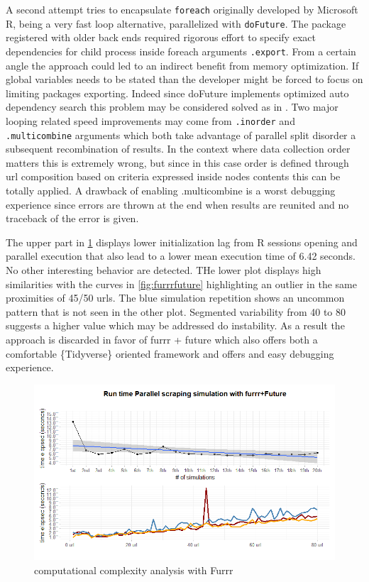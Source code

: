\documentclass[
  12pt,
  a4paper,
  oneside]{book}
\theoremstyle{definition}
\theoremstyle{definition}
\theoremstyle{definition}
\theoremstyle{remark}
\begin{document}
A second attempt tries to encapsulate \texttt{foreach} \citep{foreach} originally developed by Microsoft R, being a very fast loop alternative, parallelized with \texttt{doFuture}. The package registered with older back ends required rigorous effort to specify exact dependencies for child process inside foreach arguments \texttt{.export}. From a certain angle the approach could led to an indirect benefit from memory optimization. If global variables needs to be stated than the developer might be forced to focus on limiting packages exporting. Indeed since doFuture implements optimized auto dependency search this problem may be considered solved as in \citet{doFuture}. Two major looping related speed improvements may come from \texttt{.inorder} and \texttt{.multicombine} arguments which both take advantage of parallel split disorder a subsequent recombination of results. In the context where data collection order matters this is extremely wrong, but since in this case order is defined through url composition based on criteria expressed inside nodes contents this can be totally applied. A drawback of enabling .multicombine is a worst debugging experience since errors are thrown at the end when results are reunited and no traceback of the error is given.

The upper part in \ref{fig:foreachdofuture} displays lower initialization lag from R sessions opening and parallel execution that also lead to a lower mean execution time of 6.42 seconds. No other interesting behavior are detected.
THe lower plot displays high similarities with the curves in \ref{fig:furrrfuture} highlighting an outlier in the same proximities of 45/50 urls. The blue simulation repetition shows an uncommon pattern that is not seen in the other plot. Segmented variability from 40 to 80 suggests a higher value which may be addressed do instability. As a result the approach is discarded in favor of furrr + future which also offers both a comfortable \{Tidyverse\} oriented framework and offers and easy debugging experience.

\begin{figure}
\centering
\includegraphics{images/simulations/final_foreach_dofuture.png}
\caption{\label{fig:foreachdofuture}computational complexity analysis with Furrr}
\end{figure}
\end{document}
